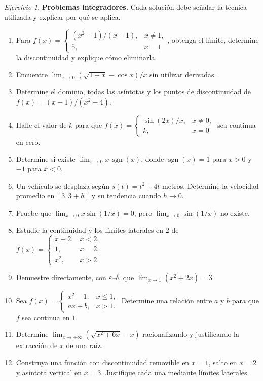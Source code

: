 \documentclass[12pt]{article}
\theoremstyle{remark}
\newtheorem{Ejer}{Ejercicio}
\begin{document}
\begin{Ejer}\textbf{Problemas integradores.} Cada solución debe señalar la técnica utilizada y explicar por qué se aplica.
\begin{enumerate}[resume=banco]
\item Para $f(x)=\begin{cases}(x^2-1)/(x-1),&x\ne1,\\5,&x=1\end{cases}$, obtenga el límite, determine la discontinuidad y explique cómo eliminarla.
\item Encuentre $\lim_{x\to0}(\sqrt{1+x}-\cos x)/x$ sin utilizar derivadas.
\item Determine el dominio, todas las asíntotas y los puntos de discontinuidad de $f(x)=(x-1)/(x^2-4)$.
\item Halle el valor de $k$ para que $f(x)=\begin{cases}\sin(2x)/x,&x\ne0,\\k,&x=0\end{cases}$ sea continua en cero.
\item Determine si existe $\lim_{x\to0}x\,\operatorname{sgn}(x)$, donde $\operatorname{sgn}(x)=1$ para $x>0$ y $-1$ para $x<0$.
\item Un vehículo se desplaza según $s(t)=t^2+4t$ metros. Determine la velocidad promedio en $[3,3+h]$ y su tendencia cuando $h\to0$.
\item Pruebe que $\lim_{x\to0}x\sin(1/x)=0$, pero $\lim_{x\to0}\sin(1/x)$ no existe.
\item Estudie la continuidad y los límites laterales en $2$ de $f(x)=\begin{cases}x+2,&x<2,\\1,&x=2,\\x^2,&x>2.\end{cases}$
\item Demuestre directamente, con $\varepsilon$--$\delta$, que $\lim_{x\to1}(x^2+2x)=3$.
\item Sea $f(x)=\begin{cases}x^2-1,&x\le1,\\ax+b,&x>1.\end{cases}$ Determine una relación entre $a$ y $b$ para que $f$ sea continua en $1$.
\item Determine $\lim_{x\to+\infty}(\sqrt{x^2+6x}-x)$ racionalizando y justificando la extracción de $x$ de una raíz.
\item Construya una función con discontinuidad removible en $x=1$, salto en $x=2$ y asíntota vertical en $x=3$. Justifique cada una mediante límites laterales.
\end{enumerate}
\end{Ejer}
\end{document}
